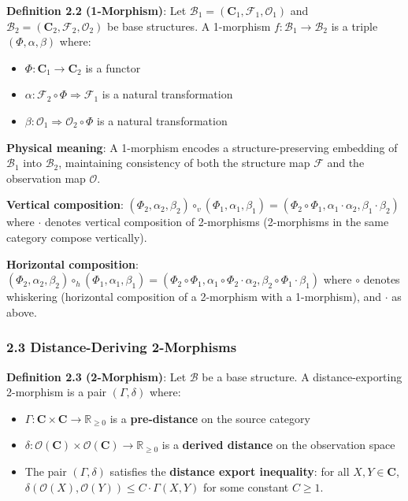 \documentclass[
]{article}
\providecommand{\tightlist}{%
  \setlength{\itemsep}{0pt}\setlength{\parskip}{0pt}}
\begin{document}
\textbf{Definition 2.2 (1-Morphism)}: Let
\(\mathcal{B}_1 = (\mathbf{C}_1, \mathcal{F}_1, \mathcal{O}_1)\) and
\(\mathcal{B}_2 = (\mathbf{C}_2, \mathcal{F}_2, \mathcal{O}_2)\) be base
structures. A 1-morphism \(f: \mathcal{B}_1 \to \mathcal{B}_2\) is a
triple \((\Phi, \alpha, \beta)\) where:

\begin{itemize}
\tightlist
\item
  \(\Phi: \mathbf{C}_1 \to \mathbf{C}_2\) is a functor
\item
  \(\alpha: \mathcal{F}_2 \circ \Phi \Rightarrow \mathcal{F}_1\) is a
  natural transformation
\item
  \(\beta: \mathcal{O}_1 \Rightarrow \mathcal{O}_2 \circ \Phi\) is a
  natural transformation
\end{itemize}

\textbf{Physical meaning}: A 1-morphism encodes a structure-preserving
embedding of \(\mathcal{B}_1\) into \(\mathcal{B}_2\), maintaining
consistency of both the structure map \(\mathcal{F}\) and the
observation map \(\mathcal{O}\).

\textbf{Vertical composition}:
\((\Phi_2, \alpha_2, \beta_2) \circ_v (\Phi_1, \alpha_1, \beta_1) = (\Phi_2 \circ \Phi_1, \alpha_1 \cdot \alpha_2, \beta_1 \cdot \beta_2)\)
where \(\cdot\) denotes vertical composition of 2-morphisms (2-morphisms in the same category compose vertically).

\textbf{Horizontal composition}:
\((\Phi_2, \alpha_2, \beta_2) \circ_h (\Phi_1, \alpha_1, \beta_1) = (\Phi_2 \circ \Phi_1, \alpha_1 \circ \Phi_2 \cdot \alpha_2, \beta_2 \circ \Phi_1 \cdot \beta_1)\)
where \(\circ\) denotes whiskering (horizontal composition of a 2-morphism with a 1-morphism), and \(\cdot\) as above.

\subsubsection{2.3 Distance-Deriving
2-Morphisms}\label{distance-deriving-2-morphisms}

\textbf{Definition 2.3 (2-Morphism)}: Let \(\mathcal{B}\) be a base
structure. A distance-exporting 2-morphism is a pair
\((\Gamma, \delta)\) where:

\begin{itemize}
\tightlist
\item
  \(\Gamma: \mathbf{C} \times \mathbf{C} \to \mathbb{R}_{\geq 0}\) is a
  \textbf{pre-distance} on the source category
\item
  \(\delta: \mathcal{O}(\mathbf{C}) \times \mathcal{O}(\mathbf{C}) \to \mathbb{R}_{\geq 0}\)
  is a \textbf{derived distance} on the observation space
\item
  The pair \((\Gamma, \delta)\) satisfies the \textbf{distance export
  inequality}: for all \(X, Y \in \mathbf{C}\),
  \(\delta(\mathcal{O}(X), \mathcal{O}(Y)) \leq C \cdot \Gamma(X, Y)\)
  for some constant \(C \geq 1\).
\end{itemize}
\end{document}
